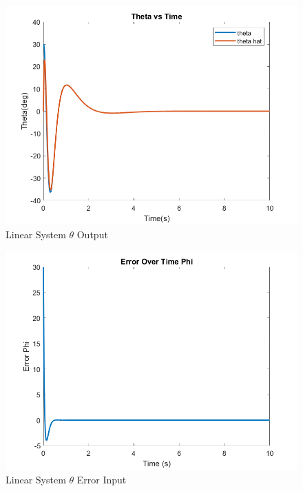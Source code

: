 \begin{figure}[!ht]
    \centering
    \includegraphics[width=\linewidth]{figs/of_lin_theta.png}
    \caption{Linear System $\theta$ Output}
    \label{}
\end{figure}

\begin{figure}[!ht]
    \centering
    \includegraphics[width=\linewidth]{figs/of_lin_theta_err.png}
    \caption{Linear System $\theta$ Error Input}
    \label{}
\end{figure}


